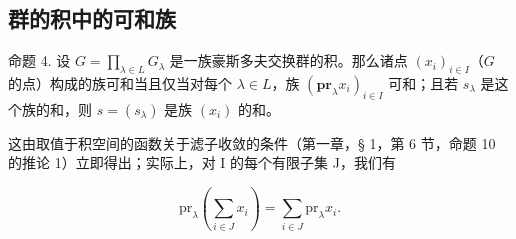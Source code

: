 \subsection{群的积中的可和族}

命题 4. 设 \(G = \prod_{\lambda \in L} G_{\lambda}\) 是一族豪斯多夫交换群的积。那么诸点 \((x_{i})_{i \in I}\)（\(G\) 的点）构成的族可和当且仅当对每个 \(\lambda \in L\)，族 \((\mathbf{pr}_{\lambda} x_{i})_{i \in I}\) 可和；且若 \(s_{\lambda}\) 是这个族的和，则 \(s = (s_{\lambda})\) 是族 \((x_{i})\) 的和。

这由取值于积空间的函数关于滤子收敛的条件（第一章，§ 1，第 6 节，命题 10 的推论 1）立即得出；实际上，对 I 的每个有限子集 J，我们有

\[
\mathrm{pr} _ {\lambda} \left(\sum_ {i \in J} x _ {i}\right) = \sum_ {i \in J} \mathrm{pr} _ {\lambda} x _ {i}.
\]

